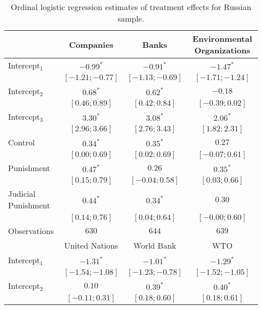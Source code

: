 \begin{table}[h]
\begin{center}
\caption{Ordinal logistic regression estimates of treatment effects for Russian sample.}
\begin{threeparttable}
\begin{tabular}{l c c c}
\hline
 & Companies & Banks & Environmental
Organizations \\
\hline
Intercept$_1$       & $-0.99^{*}$       & $-0.91^{*}$       & $-1.47^{*}$       \\
                    & $ [-1.21; -0.77]$ & $ [-1.13; -0.69]$ & $ [-1.71; -1.24]$ \\
Intercept$_2$       & $0.68^{*}$        & $0.62^{*}$        & $-0.18$           \\
                    & $ [ 0.46;  0.89]$ & $ [ 0.42;  0.84]$ & $ [-0.39;  0.02]$ \\
Intercept$_3$       & $3.30^{*}$        & $3.08^{*}$        & $2.06^{*}$        \\
                    & $ [ 2.96;  3.66]$ & $ [ 2.76;  3.43]$ & $ [ 1.82;  2.31]$ \\
Control             & $0.34^{*}$        & $0.35^{*}$        & $0.27$            \\
                    & $ [ 0.00;  0.69]$ & $ [ 0.02;  0.69]$ & $ [-0.07;  0.61]$ \\
Punishment          & $0.47^{*}$        & $0.26$            & $0.35^{*}$        \\
                    & $ [ 0.15;  0.79]$ & $ [-0.04;  0.58]$ & $ [ 0.03;  0.66]$ \\
Judicial Punishment & $0.44^{*}$        & $0.34^{*}$        & $0.30$            \\
                    & $ [ 0.14;  0.76]$ & $ [ 0.04;  0.64]$ & $ [-0.00;  0.60]$ \\
\hline
Observations        & $630$             & $644$             & $639$             \\
\hline
 & United Nations & World Bank & WTO \\
\hline
Intercept$_1$       & $-1.31^{*}$       & $-1.01^{*}$       & $-1.29^{*}$       \\
                    & $ [-1.54; -1.08]$ & $ [-1.23; -0.78]$ & $ [-1.52; -1.05]$ \\
Intercept$_2$       & $0.10$            & $0.39^{*}$        & $0.40^{*}$        \\
                    & $ [-0.11;  0.31]$ & $ [ 0.18;  0.60]$ & $ [ 0.18;  0.61]$ \\

\end{tabular}
\end{threeparttable}
\end{center}
\end{table}

